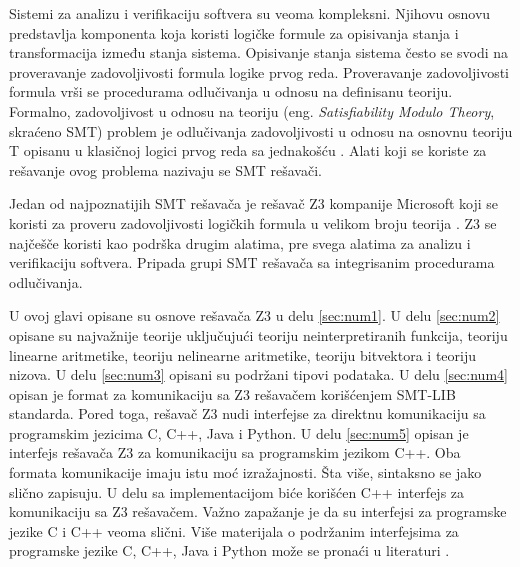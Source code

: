 \documentclass[12pt,oneside]{memoir}
\begin{document}
Sistemi za analizu i verifikaciju softvera su veoma kompleksni. Njihovu osnovu predstavlja komponenta koja koristi logičke formule za opisivanja stanja i transformacija između stanja sistema. Opisivanje stanja sistema često se svodi na proveravanje zadovoljivosti formula logike prvog reda. 
Proveravanje zadovoljivosti formula vrši se procedurama odlučivanja u odnosu na definisanu teoriju. Formalno, zadovoljivost u odnosu na teoriju (eng. \textit{Satisfiability Modulo Theory}, skraćeno SMT) problem je odlučivanja zadovoljivosti u odnosu na osnovnu teoriju T opisanu u klasičnoj logici prvog reda sa jednakošću \cite{Barrett}. Alati koji se koriste za rešavanje ovog problema nazivaju se SMT rešavači. 
\par

Jedan od najpoznatijih SMT rešavača je rešavač Z3 kompanije Microsoft koji se koristi za proveru zadovoljivosti logičkih formula u velikom broju teorija \cite{EfficientSMTSolver}. Z3 se najčešče koristi kao podrška drugim alatima, pre svega alatima za analizu i verifikaciju softvera. Pripada grupi SMT rešavača sa integrisanim procedurama odlučivanja.
\par
U ovoj glavi opisane su osnove rešavača Z3 u delu \ref{sec:num1}. U delu \ref{sec:num2} opisane su najvažnije teorije uključujući teoriju neinterpretiranih funkcija, teoriju linearne aritmetike, teoriju nelinearne aritmetike, teoriju bitvektora i teoriju nizova. U delu \ref{sec:num3} opisani su  podržani tipovi podataka. U delu \ref{sec:num4} opisan je format za komunikaciju sa Z3 rešavačem korišćenjem SMT-LIB standarda. Pored toga, rešavač Z3 nudi interfejse za direktnu komunikaciju sa programskim jezicima C, C++, Java i Python. U delu \ref{sec:num5} opisan je interfejs rešavača Z3 za komunikaciju sa programskim jezikom C++. Oba formata komunikacije imaju istu moć izražajnosti. Šta više, sintaksno se jako slično zapisuju. U delu sa implementacijom biće korišćen C++ interfejs za komunikaciju sa Z3 rešavačem. Važno zapažanje je da su interfejsi za programske jezike C i C++ veoma slični. Više materijala o podržanim interfejsima za programske jezike C, C++, Java i Python može se pronaći u literaturi \cite{api}.
\end{document}
